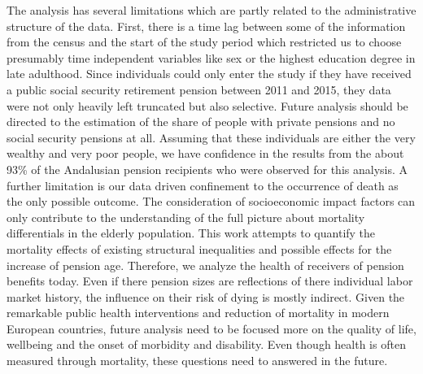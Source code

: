 \documentclass[a4paper,10pt,oneside,english]{article}
\begin{document}
The analysis has several limitations which are partly related to the administrative structure of the data. First, there is a time lag between some of the information from the census and the start of the study period which restricted us to choose presumably time independent variables like sex or the highest education degree in late adulthood. Since individuals could only enter the study if they have received a public social security retirement pension between 2011 and 2015, they data were not only heavily left truncated but also selective. Future analysis should be directed to the estimation of the share of people with private pensions and no social security pensions at all. Assuming that these individuals are either the very wealthy and very poor people, we have confidence in the results from the about 93\% of the Andalusian pension recipients who were observed for this analysis. A further limitation is our data driven confinement to the occurrence of death as the only possible outcome. The consideration of socioeconomic impact factors can only contribute to the understanding of the full picture about mortality differentials in the elderly population. This work attempts to quantify the mortality effects of existing structural inequalities and possible effects for the increase of pension age. Therefore, we analyze the health of receivers of pension benefits today. Even if there pension sizes are reflections of there individual labor market history, the influence on their risk of dying is mostly indirect. Given the remarkable public health interventions and reduction of mortality in modern European countries, future analysis need to be focused more on the quality of life, wellbeing and the onset of morbidity and disability. Even though health is often measured through mortality, these questions need to answered in the future.
\end{document}
